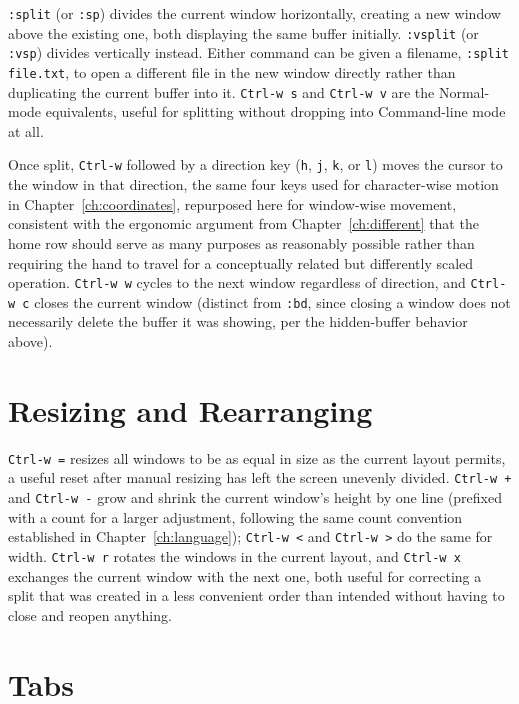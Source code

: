 \texttt{:split} (or \texttt{:sp}) divides the current window horizontally, creating a new window above the existing one, both displaying the same buffer initially. \texttt{:vsplit} (or \texttt{:vsp}) divides vertically instead. Either command can be given a filename, \texttt{:split file.txt}, to open a different file in the new window directly rather than duplicating the current buffer into it. \texttt{Ctrl-w s} and \texttt{Ctrl-w v} are the Normal-mode equivalents, useful for splitting without dropping into Command-line mode at all.

Once split, \texttt{Ctrl-w} followed by a direction key (\texttt{h}, \texttt{j}, \texttt{k}, or \texttt{l}) moves the cursor to the window in that direction, the same four keys used for character-wise motion in Chapter~\ref{ch:coordinates}, repurposed here for window-wise movement, consistent with the ergonomic argument from Chapter~\ref{ch:different} that the home row should serve as many purposes as reasonably possible rather than requiring the hand to travel for a conceptually related but differently scaled operation. \texttt{Ctrl-w w} cycles to the next window regardless of direction, and \texttt{Ctrl-w c} closes the current window (distinct from \texttt{:bd}, since closing a window does not necessarily delete the buffer it was showing, per the hidden-buffer behavior above).

\section{Resizing and Rearranging}

\texttt{Ctrl-w =} resizes all windows to be as equal in size as the current layout permits, a useful reset after manual resizing has left the screen unevenly divided. \texttt{Ctrl-w +} and \texttt{Ctrl-w -} grow and shrink the current window's height by one line (prefixed with a count for a larger adjustment, following the same count convention established in Chapter~\ref{ch:language}); \texttt{Ctrl-w <} and \texttt{Ctrl-w >} do the same for width. \texttt{Ctrl-w r} rotates the windows in the current layout, and \texttt{Ctrl-w x} exchanges the current window with the next one, both useful for correcting a split that was created in a less convenient order than intended without having to close and reopen anything.

\section{Tabs}


